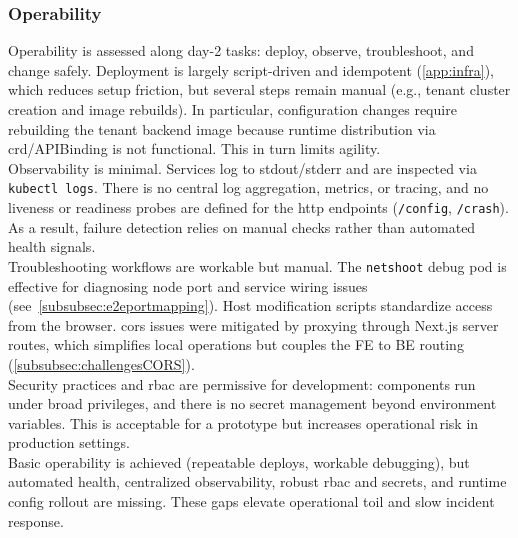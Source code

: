 \documentclass[11pt, a4paper, oneside, listof=totoc]{scrartcl}
\begin{document}
            \subsubsection{Operability}\label{subsubsec:evalOperability}
                Operability is assessed along day-2 tasks: deploy, observe, troubleshoot, and change
                safely.
                Deployment is largely script-driven and idempotent (\autoref{app:infra}), which
                reduces setup friction, but several steps remain manual (e.g., tenant cluster
                creation and image rebuilds).
                In particular, configuration changes require rebuilding the tenant backend image
                because runtime distribution via \gls{crd}/APIBinding is not functional.
                This in turn limits agility.\\
                Observability is minimal. Services log to stdout/stderr and are inspected via
                \texttt{kubectl logs}.
                There is no central log aggregation, metrics, or tracing, and no liveness or
                readiness probes are defined for the \gls{http} endpoints
                (\texttt{/config}, \texttt{/crash}).
                As a result, failure detection relies on manual checks rather than automated health
                signals.\\
                Troubleshooting workflows are workable but manual. The \texttt{netshoot} debug pod
                is effective for diagnosing node port and service wiring issues
                (see~\autoref{subsubsec:e2eportmapping}).
                Host modification scripts standardize access from the browser.
                \gls{cors} issues were mitigated by proxying through Next.js server routes, which
                simplifies local operations but couples the FE to BE routing
                (\autoref{subsubsec:challengesCORS}).\\
                Security practices and \gls{rbac} are permissive for development: components run
                under broad privileges, and there is no secret management beyond environment
                variables.
                This is acceptable for a prototype but increases operational risk in production
                settings.\\
                Basic operability is achieved (repeatable deploys, workable debugging), but
                automated health, centralized observability, robust \gls{rbac} and secrets, and
                runtime config rollout are missing.
                These gaps elevate operational toil and slow incident response.
\end{document}
